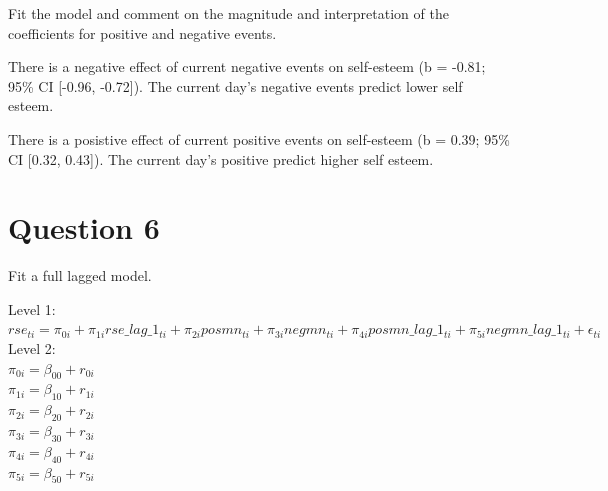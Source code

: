 \documentclass[]{article}
\begin{document}
Fit the model and comment on the magnitude and interpretation of the
coefficients for positive and negative events.

There is a negative effect of current negative events on self-esteem (b
= -0.81; 95\% CI {[}-0.96, -0.72{]}). The current day's negative events
predict lower self esteem.

There is a posistive effect of current positive events on self-esteem (b
= 0.39; 95\% CI {[}0.32, 0.43{]}). The current day's positive predict
higher self esteem.

\section{Question 6}\label{question-6}

Fit a full lagged model.

Level 1:\\
\(rse_{ti} = \pi_{0i} + \pi_{1i}rse\_lag\_1_{ti} + \pi_{2i}posmn_{ti} + \pi_{3i}negmn_{ti} + \pi_{4i}posmn\_lag\_1_{ti} + \pi_{5i}negmn\_lag\_1_{ti} + \epsilon_{ti}\)\\
Level 2:\\
\(\pi_{0i} = \beta_{00} + r_{0i}\)\\
\(\pi_{1i} = \beta_{10} + r_{1i}\)\\
\(\pi_{2i} = \beta_{20} + r_{2i}\)\\
\(\pi_{3i} = \beta_{30} + r_{3i}\)\\
\(\pi_{4i} = \beta_{40} + r_{4i}\)\\
\(\pi_{5i} = \beta_{50} + r_{5i}\)
\end{document}
